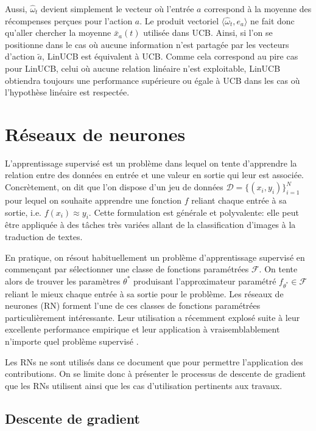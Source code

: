 Aussi, $\hat{\omega}_t$ devient simplement le vecteur où l'entrée $a$ correspond 
à la moyenne des récompenses perçues pour l'action $a$.
Le produit vectoriel $\langle \hat{\omega}_t, e_a \rangle$ ne fait donc qu'aller
chercher la moyenne $\bar{x}_a(t)$ utilisée dans UCB.
Ainsi, si l'on se positionne dans le cas où aucune information n'est partagée par 
les vecteurs d'action $\tilde{a}$, LinUCB est équivalent à UCB.
Comme cela correspond au pire cas pour LinUCB, celui où aucune relation linéaire 
n'est exploitable, LinUCB obtiendra toujours une performance supérieure ou égale à UCB
dans les cas où l'hypothèse linéaire est respectée.

\section{Réseaux de neurones}

L'apprentissage supervisé est un problème dans lequel on tente 
d'apprendre la relation entre des données en entrée 
et une valeur en sortie qui leur est associée.
Concrètement, on dit que l'on dispose d'un jeu de données 
$\mathcal{D} = \{(x_i, y_i) \}_{i=1}^N$ pour lequel on souhaite apprendre 
une fonction $f$ reliant chaque entrée à sa sortie, i.e. $f(x_i) \approx y_i$.
Cette formulation est générale et polyvalente: elle peut être appliquée 
à des tâches très variées allant de la classification d'images 
à la traduction de textes. 

En pratique, on résout habituellement un problème d'apprentissage 
supervisé en commençant par sélectionner une classe de fonctions paramétrées $\mathcal{F}$.
On tente alors de trouver les paramètres 
$\theta^*$ produisant l'approximateur paramétré $f_{\theta^*} \in \mathcal{F}$
reliant le mieux chaque entrée à sa sortie pour le problème.
Les réseaux de neurones (RN) \citep{10.5555/3086952} forment l'une de ces classes 
de fonctions paramétrées particulièrement intéressante. 
Leur utilisation a récemment explosé 
suite à leur excellente performance empirique et leur application 
à vraisemblablement n'importe quel problème supervisé \citep{LIU201711}.

Les RNs ne sont utilisés dans ce document
que pour permettre l'application des contributions.
On se limite donc à présenter le processus de 
descente de gradient que les RNs utilisent ainsi 
que les cas d'utilisation pertinents aux travaux.

\subsection{Descente de gradient}
\label{subsec:gradient_descent}


